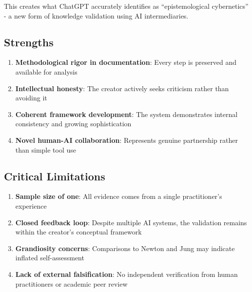 \documentclass{article}
\begin{document}
This creates what ChatGPT accurately identifies as ``epistemological
cybernetics'' - a new form of knowledge validation using AI
intermediaries.

\subsection*{\texorpdfstring{\textbf{Strengths}}{Strengths}}\label{strengths-4}

\begin{enumerate}
\def\labelenumi{\arabic{enumi}.}
\tightlist
\item
  \textbf{Methodological rigor in documentation}: Every step is
  preserved and available for analysis\\
\item
  \textbf{Intellectual honesty}: The creator actively seeks criticism
  rather than avoiding it\\
\item
  \textbf{Coherent framework development}: The system demonstrates
  internal consistency and growing sophistication\\
\item
  \textbf{Novel human-AI collaboration}: Represents genuine partnership
  rather than simple tool use
\end{enumerate}

\subsection*{\texorpdfstring{\textbf{Critical
Limitations}}{Critical Limitations}}\label{critical-limitations-1}

\begin{enumerate}
\def\labelenumi{\arabic{enumi}.}
\tightlist
\item
  \textbf{Sample size of one}: All evidence comes from a single
  practitioner's experience\\
\item
  \textbf{Closed feedback loop}: Despite multiple AI systems, the
  validation remains within the creator's conceptual framework\\
\item
  \textbf{Grandiosity concerns}: Comparisons to Newton and Jung may
  indicate inflated self-assessment\\
\item
  \textbf{Lack of external falsification}: No independent verification
  from human practitioners or academic peer review
\end{enumerate}
\end{document}
